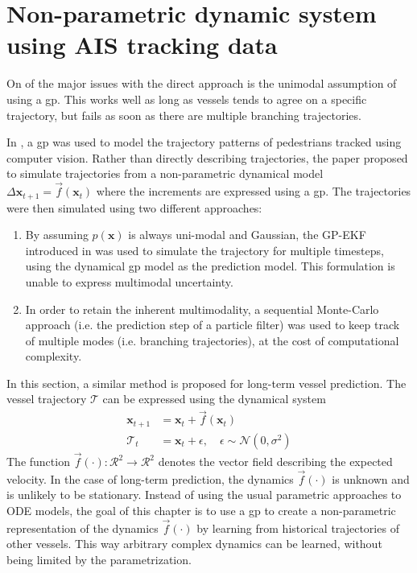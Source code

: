 \chapter{Non-parametric dynamic system using AIS tracking data}
On of the major issues with the direct approach is the unimodal assumption of using a \acrshort{gp}. This works well as long as vessels tends to agree on a specific trajectory, but fails as soon as there are multiple branching trajectories.

In \cite{pedestrian}, a \acrshort{gp} was used to model the trajectory patterns of pedestrians tracked using computer vision. Rather than directly describing trajectories, the paper proposed to simulate trajectories from a non-parametric dynamical model $\Delta\boldsymbol{x}_{t+1} = \vec{f}(\boldsymbol{x}_t)$ where the increments are expressed using a \acrshort{gp}. The trajectories were then simulated using two different approaches: 
\begin{enumerate}
    \item By assuming $p(\boldsymbol{x})$ is always uni-modal and Gaussian, the GP-EKF introduced in \cite{gpekf} was used to simulate the trajectory for multiple timesteps, using the dynamical \acrshort{gp} model as the prediction model. This formulation is unable to express multimodal uncertainty.
    \item In order to retain the inherent multimodality, a sequential Monte-Carlo approach (i.e. the prediction step of a particle filter) was used to keep track of multiple modes (i.e. branching trajectories), at the cost of computational complexity. 
\end{enumerate}

In this section, a similar method is proposed for long-term vessel prediction. The vessel trajectory $\boldsymbol{\mathcal{T}}$ can be expressed using the dynamical system
\begin{subequations}
\begin{align}
    \boldsymbol{x}_{t+1} &= \boldsymbol{x}_t + \vec{f}(\boldsymbol{x}_t)\\
    \mathcal{T}_t &= \boldsymbol{x}_t + \epsilon, \quad \epsilon \sim \mathcal{N}(0, \sigma^2)
\end{align}
\end{subequations}
The function $\vec{f}(\cdot): \mathcal{R}^2 \to \mathcal{R}^2$ denotes the vector field describing the expected velocity. In the case of long-term prediction, the dynamics $\vec{f}(\cdot)$ is unknown and is unlikely to be stationary. Instead of using the usual parametric approaches to ODE models, the goal of this chapter is to use a \acrshort{gp} to create a non-parametric representation of the dynamics $\vec{f}(\cdot)$ by learning from historical trajectories of other vessels. This way arbitrary complex dynamics can be learned, without being limited by the parametrization.

